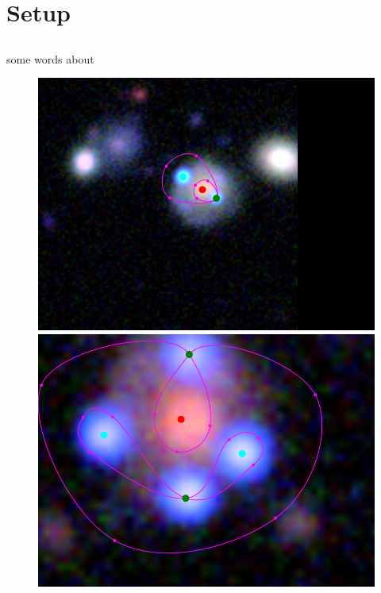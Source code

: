 \section {Setup} \label{sec:setup}

\subsection{\sw} \label{sec:SpaceWarps}
some words about \sw


\begin{figure}
\includegraphics[height=.3\vsize]{fig/spag6941.png} \\
\includegraphics[height=.3\vsize]{fig/spag7022.png} \\

\end{figure}
